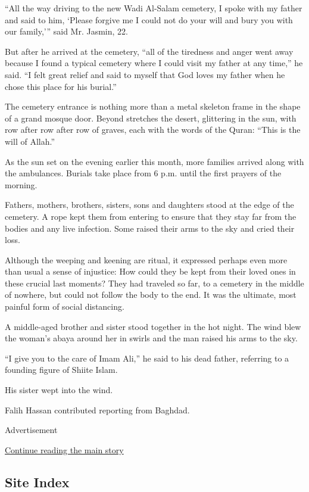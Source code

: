 ``All the way driving to the new Wadi Al-Salam cemetery, I spoke with my
father and said to him, `Please forgive me I could not do your will and
bury you with our family,''' said Mr. Jasmin, 22.

But after he arrived at the cemetery, ``all of the tiredness and anger
went away because I found a typical cemetery where I could visit my
father at any time,'' he said. ``I felt great relief and said to myself
that God loves my father when he chose this place for his burial.''

The cemetery entrance is nothing more than a metal skeleton frame in the
shape of a grand mosque door. Beyond stretches the desert, glittering in
the sun, with row after row after row of graves, each with the words of
the Quran: ``This is the will of Allah.''

As the sun set on the evening earlier this month, more families arrived
along with the ambulances. Burials take place from 6 p.m. until the
first prayers of the morning.

Fathers, mothers, brothers, sisters, sons and daughters stood at the
edge of the cemetery. A rope kept them from entering to ensure that they
stay far from the bodies and any live infection. Some raised their arms
to the sky and cried their loss.

Although the weeping and keening are ritual, it expressed perhaps even
more than usual a sense of injustice: How could they be kept from their
loved ones in these crucial last moments? They had traveled so far, to a
cemetery in the middle of nowhere, but could not follow the body to the
end. It was the ultimate, most painful form of social distancing.

A middle-aged brother and sister stood together in the hot night. The
wind blew the woman's abaya around her in swirls and the man raised his
arms to the sky.

``I give you to the care of Imam Ali,'' he said to his dead father,
referring to a founding figure of Shiite Islam.

His sister wept into the wind.

Falih Hassan contributed reporting from Baghdad.

Advertisement

\protect\hyperlink{after-bottom}{Continue reading the main story}

\hypertarget{site-index}{%
\subsection{Site Index}\label{site-index}}

